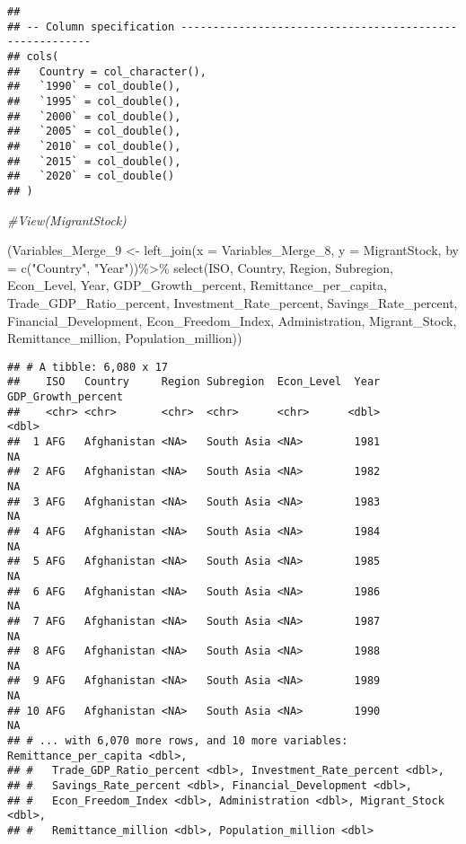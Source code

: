 \documentclass[
]{article}
\newenvironment{Shaded}{\begin{snugshade}}{\end{snugshade}}
\newcommand{\AttributeTok}[1]{\textcolor[rgb]{0.77,0.63,0.00}{#1}}
\newcommand{\CommentTok}[1]{\textcolor[rgb]{0.56,0.35,0.01}{\textit{#1}}}
\newcommand{\FunctionTok}[1]{\textcolor[rgb]{0.00,0.00,0.00}{#1}}
\newcommand{\NormalTok}[1]{#1}
\newcommand{\OtherTok}[1]{\textcolor[rgb]{0.56,0.35,0.01}{#1}}
\newcommand{\SpecialCharTok}[1]{\textcolor[rgb]{0.00,0.00,0.00}{#1}}
\newcommand{\StringTok}[1]{\textcolor[rgb]{0.31,0.60,0.02}{#1}}
\begin{document}
\begin{verbatim}
## 
## -- Column specification --------------------------------------------------------
## cols(
##   Country = col_character(),
##   `1990` = col_double(),
##   `1995` = col_double(),
##   `2000` = col_double(),
##   `2005` = col_double(),
##   `2010` = col_double(),
##   `2015` = col_double(),
##   `2020` = col_double()
## )
\end{verbatim}

\begin{Shaded}
\begin{Highlighting}[]
\CommentTok{\#View(MigrantStock)}


\NormalTok{(Variables\_Merge\_9 }\OtherTok{\textless{}{-}} \FunctionTok{left\_join}\NormalTok{(}\AttributeTok{x =}\NormalTok{ Variables\_Merge\_8, }\AttributeTok{y =}\NormalTok{ MigrantStock, }\AttributeTok{by =} \FunctionTok{c}\NormalTok{(}\StringTok{"Country"}\NormalTok{, }\StringTok{"Year"}\NormalTok{))}\SpecialCharTok{\%\textgreater{}\%}
  \FunctionTok{select}\NormalTok{(ISO, Country, Region, Subregion, Econ\_Level, Year, GDP\_Growth\_percent, Remittance\_per\_capita, Trade\_GDP\_Ratio\_percent, Investment\_Rate\_percent, Savings\_Rate\_percent, Financial\_Development, Econ\_Freedom\_Index, Administration, Migrant\_Stock, Remittance\_million, Population\_million))}
\end{Highlighting}
\end{Shaded}

\begin{verbatim}
## # A tibble: 6,080 x 17
##    ISO   Country     Region Subregion  Econ_Level  Year GDP_Growth_percent
##    <chr> <chr>       <chr>  <chr>      <chr>      <dbl>              <dbl>
##  1 AFG   Afghanistan <NA>   South Asia <NA>        1981                 NA
##  2 AFG   Afghanistan <NA>   South Asia <NA>        1982                 NA
##  3 AFG   Afghanistan <NA>   South Asia <NA>        1983                 NA
##  4 AFG   Afghanistan <NA>   South Asia <NA>        1984                 NA
##  5 AFG   Afghanistan <NA>   South Asia <NA>        1985                 NA
##  6 AFG   Afghanistan <NA>   South Asia <NA>        1986                 NA
##  7 AFG   Afghanistan <NA>   South Asia <NA>        1987                 NA
##  8 AFG   Afghanistan <NA>   South Asia <NA>        1988                 NA
##  9 AFG   Afghanistan <NA>   South Asia <NA>        1989                 NA
## 10 AFG   Afghanistan <NA>   South Asia <NA>        1990                 NA
## # ... with 6,070 more rows, and 10 more variables: Remittance_per_capita <dbl>,
## #   Trade_GDP_Ratio_percent <dbl>, Investment_Rate_percent <dbl>,
## #   Savings_Rate_percent <dbl>, Financial_Development <dbl>,
## #   Econ_Freedom_Index <dbl>, Administration <dbl>, Migrant_Stock <dbl>,
## #   Remittance_million <dbl>, Population_million <dbl>
\end{verbatim}
\end{document}
